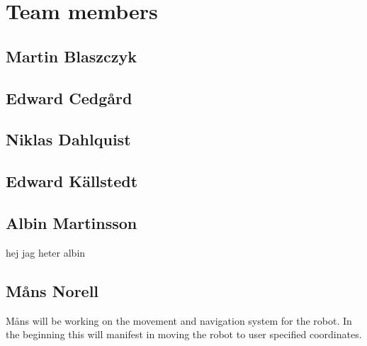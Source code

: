 \section{Team members}

\subsection{Martin Blaszczyk}

\subsection{Edward Cedgård}

\subsection{Niklas Dahlquist}

\subsection{Edward Källstedt}

\subsection{Albin Martinsson} hej jag heter albin

\subsection{Måns Norell}
Måns will be working on the movement and navigation system for the robot. In the beginning this will manifest in moving the robot to user specified coordinates.









